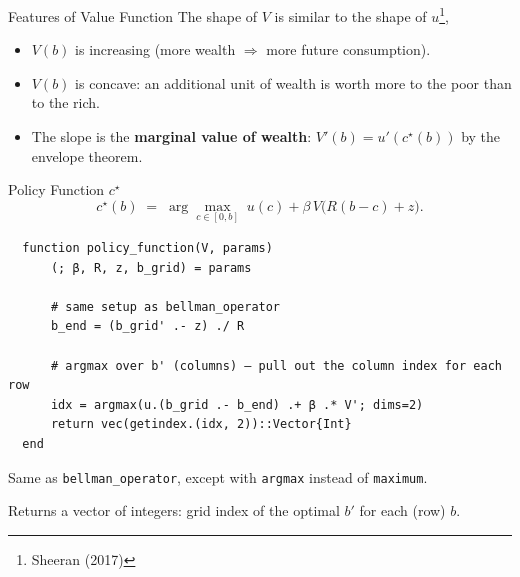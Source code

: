 \documentclass[10pt,aspectratio=169]{beamer}
\begin{document}
\begin{frame}{Features of Value Function}
  The shape of $V$ is similar to the shape of $u$\footnote{Sheeran (2017)},
  \begin{itemize}
    \item $V(b)$ is increasing (more wealth $\Rightarrow$ more future consumption).
    \item $V(b)$ is concave: an additional unit of wealth is worth more to the poor than to the rich.
    \item The slope is the \textbf{marginal value of wealth}: $V'(b) = u'(c^\star(b))$ by the envelope theorem.
  \end{itemize}
\end{frame}

\begin{frame}[fragile]{Policy Function $c^\star$}
  \[
    c^\star(b) \;=\; \arg\max_{c \in [0, b]} \; u(c) + \beta \, V\!\big(R(b - c) + z\big).
  \]
  \begin{lstlisting}
  function policy_function(V, params)
      (; β, R, z, b_grid) = params

      # same setup as bellman_operator
      b_end = (b_grid' .- z) ./ R

      # argmax over b' (columns) — pull out the column index for each row
      idx = argmax(u.(b_grid .- b_end) .+ β .* V'; dims=2)
      return vec(getindex.(idx, 2))::Vector{Int}
  end
  \end{lstlisting}
  Same as \texttt{bellman\_operator}, except with \texttt{argmax} instead of \texttt{maximum}.
  
  Returns a vector of integers: grid index of the optimal $b'$ for each (row) $b$.
\end{frame}
\end{document}
